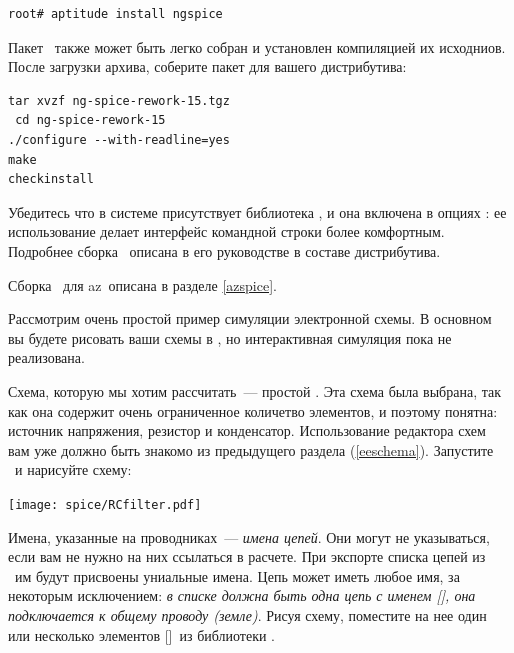 





\begin{verbatim}
root# aptitude install ngspice
\end{verbatim}

Пакет \pack{\ngs}\ также может быть легко собран и установлен компиляцией
их исходниов. После загрузки архива, соберите пакет для вашего дистрибутива:
\begin{verbatim}
tar xvzf ng-spice-rework-15.tgz
 cd ng-spice-rework-15
./configure --with-readline=yes
make
checkinstall
\end{verbatim}

Убедитесь что в системе присутствует библиотека , и она
включена в опциях : ее использование делает интерфейс командной
строки более комфортным. Подробнее сборка \ngs\ описана в его руководстве в
составе дистрибутива.

\bigskip
Сборка \ngs\ для az\linux\ описана в разделе \ref{azspice}.

\secup


Рассмотрим очень простой пример симуляции электронной схемы. В основном вы
будете рисовать ваши схемы в \eeschema, но интерактивная симуляция пока не
реализована.

\secdown


Схема, которую мы хотим рассчитать\ --- простой . Эта схема была
выбрана, так как она содержит очень ограниченное количетво элементов, и поэтому
понятна: источник напряжения, резистор и конденсатор. Использование редактора
схем вам уже должно быть знакомо из предыдущего раздела (\ref{eeschema}).
Запустите \eeschema\ и нарисуйте схему:

\bigskip
\texttt{[image: spice/RCfilter.pdf]}
\bigskip

Имена, указанные на проводниках\ --- \emph{имена цепей}. Они могут не
указываться, если вам не нужно на них ссылаться в расчете. При экспорте списка
цепей из \eeschema\ им будут присвоены униальные имена. Цепь может иметь любое
имя, за некоторым исключением: \emph{в списке должна быть одна цепь с именем
[], она подключается к общему проводу (земле)}. Рисуя схему, поместите
на нее один или несколько элементов []\ из библиотеки .

